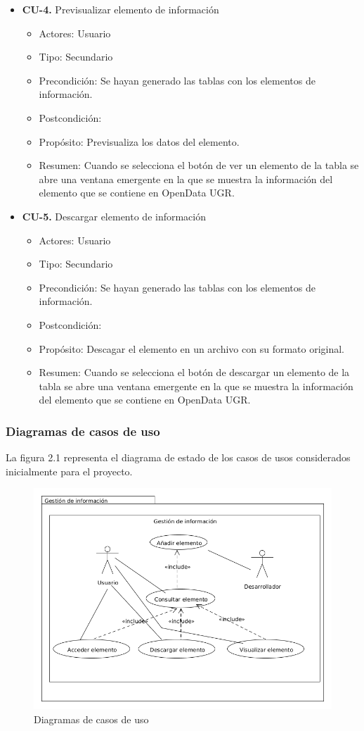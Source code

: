 \begin{itemize}
 \item \textbf{CU-4.} Previsualizar elemento de información
 \begin{itemize}
  \item Actores: Usuario
  \item Tipo: Secundario
  \item Precondición: Se hayan generado las tablas con los elementos de información.
  \item Postcondición: 
  \item Propósito: Previsualiza los datos del elemento.
  \item Resumen: Cuando se selecciona el botón de ver un elemento de la tabla se abre una ventana emergente en la que se 
  muestra la información del elemento que se contiene en OpenData UGR.
 \end{itemize}
\end{itemize}

\begin{itemize}
 \item \textbf{CU-5.} Descargar elemento de información
 \begin{itemize}
  \item Actores: Usuario
  \item Tipo: Secundario
  \item Precondición: Se hayan generado las tablas con los elementos de información.
  \item Postcondición: 
  \item Propósito: Descagar el elemento en un archivo con su formato original.
  \item Resumen: Cuando se selecciona el botón de descargar un elemento de la tabla se abre una ventana emergente en la que se
  muestra la información del elemento que se contiene en OpenData UGR.
 \end{itemize}
\end{itemize}

\subsubsection*{Diagramas de casos de uso}

La figura 2.1 representa el diagrama de estado de los casos de usos considerados inicialmente para el proyecto.

\newpage
\thispagestyle{empty}
\begin{figure}[h]
\caption{Diagramas de casos de uso}
\centering
\includegraphics[width=1\textwidth]{imagenes/diagrama_casos_uso.png}
\end{figure}